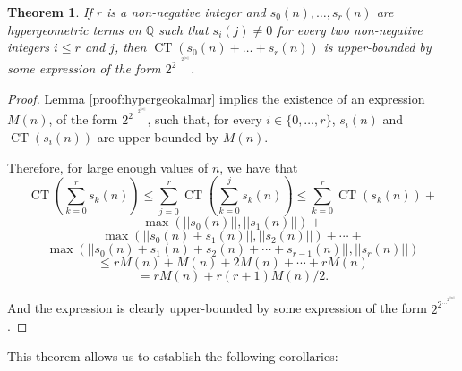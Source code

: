 \documentclass[10pt,a4paper]{article}
\theoremstyle{plain}
\DeclareMathOperator\CT{CT}
\newtheorem{theorem}{Theorem}[section]
\begin{document}
\begin{theorem} \label{proof:hypergeometricbound}
If \( r \) is a non-negative integer and \( s_0(n), \ldots, s_r(n) \) are hypergeometric terms on \( \mathbb{Q} \) such that \( s_i(j) \neq 0 \) for every two non-negative integers \( i \leq r \) and \( j \), then \( \CT ( s_0(n) + \ldots + s_r(n) ) \) is upper-bounded by some expression of the form \( 2^{2^{\ldots^{2^{||n||}}}} \).
\end{theorem}
\begin{proof}
Lemma \ref{proof:hypergeokalmar} implies the existence of an expression \( M(n) \), of the form \( 2^{2^{\ldots^{2^{||n||}}}} \), such that, for every \( i \in \{0, \ldots, r\} \), \( s_i(n) \) and \( \CT(s_i(n)) \) are upper-bounded by \( M(n) \).

Therefore, for large enough values of \( n \), we have that
$$ \CT \left( \sum_{k=0}^r s_k ( n ) \right) \leq \sum_{j=0}^r \CT \left( \sum_{k=0}^j s_k ( n ) \right) \leq \sum_{k=0}^r \CT(s_k(n)) + $$ $$ \max ( || s_0 ( n ) || , || s_1 ( n ) || ) + $$ $$ \max ( || s_0 ( n ) + s_1 ( n ) || , || s_2 ( n ) || ) + \cdots + $$ $$ \max ( || s_0 ( n ) + s_1 ( n ) + s_2 ( n ) + \cdots + s_{r - 1} ( n ) || , || s_r ( n ) || ) $$
$$ \leq r M ( n ) + M ( n ) + 2 M ( n ) + \cdots + r M ( n ) $$
$$ = r M ( n ) + r ( r + 1 ) M ( n ) / 2 . $$

And the expression is clearly upper-bounded by some expression of the form \( 2^{2^{\ldots^{2^{||n||}}}} \).
\end{proof}

This theorem allows us to establish the following corollaries:
\end{document}
